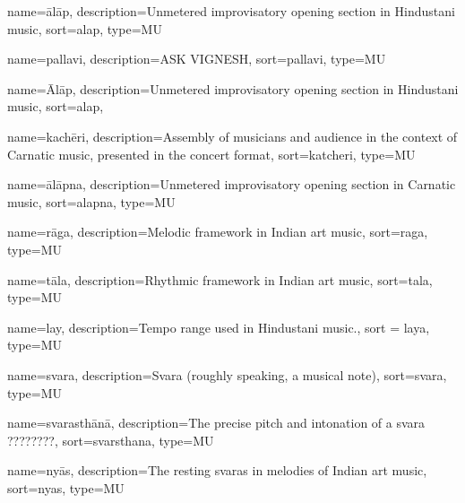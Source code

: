





{
	name={\={a}l\={a}p},
	description={Unmetered improvisatory opening section in Hindustani music},
	sort=alap,
	type=MU
}

{
	name={pallavi},
	description={ASK VIGNESH},
	sort=pallavi,
	type=MU
}


{
	name={\={A}l\={a}p},
	description={Unmetered improvisatory opening section in Hindustani music},
	sort=alap,
}

{
	name={kach\={e}ri},
	description={Assembly of musicians and audience in the context of Carnatic music, presented in the concert format},
	sort=katcheri,
	type=MU
}

{
	name={\={a}l\={a}pna},
	description={Unmetered improvisatory opening section in Carnatic music},
	sort=alapna,
	type=MU	
}

{
  name={r\={a}ga},
  description={Melodic framework in Indian art music},
  sort=raga,
	type=MU  
}

{
	name={t\={a}la},
	description={Rhythmic framework in Indian art music},
	sort=tala,
	type=MU
}

{
	name={lay},
	description={Tempo range used in Hindustani music.},
	sort = laya,
	type=MU	
}

{
	name={svara},
	description={Svara (roughly speaking, a musical note)},
	sort=svara,
	type=MU
}

{
	name={svarasth\={a}n\={a}},
	description={The precise pitch and intonation of a svara ????????},
	sort=svarsthana,
	type=MU
}

{
	name={ny\={a}s},
	description={The resting svaras in melodies of Indian art music},
	sort=nyas,
	type=MU
}

